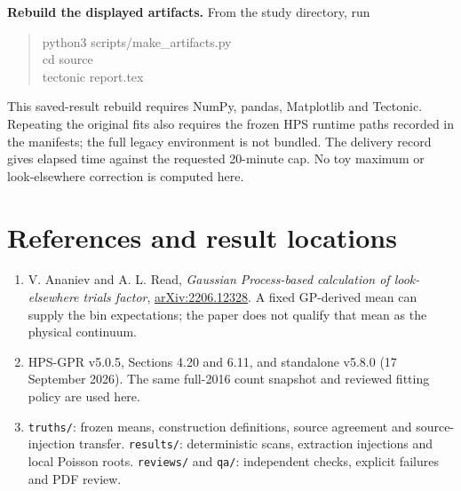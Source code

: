 \documentclass[11pt]{article}
\newcommand{\heading}[1]{\section*{\color{navy}#1}}
\begin{document}
\textbf{Rebuild the displayed artifacts.} From the study directory, run
\begin{quote}\ttfamily\small
python3 scripts/make\_artifacts.py\\
cd source\\
tectonic report.tex
\end{quote}
This saved-result rebuild requires NumPy, pandas, Matplotlib and Tectonic. Repeating the original fits also requires the frozen HPS runtime paths recorded in the manifests; the full legacy environment is not bundled. The delivery record gives elapsed time against the requested 20-minute cap. No toy maximum or look-elsewhere correction is computed here.

\heading{References and result locations}
\begin{enumerate}
\item V. Ananiev and A. L. Read, \textit{Gaussian Process-based calculation of look-elsewhere trials factor}, \href{https://arxiv.org/pdf/2206.12328}{arXiv:2206.12328}. A fixed GP-derived mean can supply the bin expectations; the paper does not qualify that mean as the physical continuum.
\item HPS-GPR v5.0.5, Sections 4.20 and 6.11, and standalone v5.8.0 (17 September 2026). The same full-2016 count snapshot and reviewed fitting policy are used here.
\item \texttt{truths/}: frozen means, construction definitions, source agreement and source-injection transfer. \texttt{results/}: deterministic scans, extraction injections and local Poisson roots. \texttt{reviews/} and \texttt{qa/}: independent checks, explicit failures and PDF review.
\end{enumerate}
\end{document}
